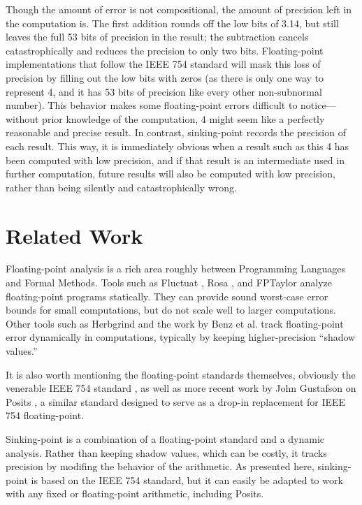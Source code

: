 \documentclass[letterpaper,10pt]{article}
\begin{document}
Though the amount of error is not compositional, the amount of precision left in the computation is. The first addition rounds off the low bits of 3.14, but still leaves the full 53 bits of precision in the result; the subtraction cancels catastrophically and reduces the precision to only two bits. Floating-point implementations that follow the IEEE 754 standard will mask this loss of precision by filling out the low bits with zeros (as there is only one way to represent 4, and it has 53 bits of precision like every other non-subnormal number). This behavior makes some floating-point errors difficult to notice---without prior knowledge of the computation, 4 might seem like a perfectly reasonable and precise result. In contrast, sinking-point records the precision of each result. This way, it is immediately obvious when a result such as this 4 has been computed with low precision, and if that result is an intermediate used in further computation, future results will also be computed with low precision, rather than being silently and catastrophically wrong.

\section{Related Work}

Floating-point analysis is a rich area roughly between Programming Languages and Formal Methods. Tools such as Fluctuat \cite{fluctuat}, Rosa \cite{rosa}, and FPTaylor \cite{fptaylor} analyze floating-point programs statically. They can provide sound worst-case error bounds for small computations, but do not scale well to larger computations. Other tools such as Herbgrind \cite{herbgrind} and the work by Benz et al. \cite{benz2012dynamic} track floating-point error dynamically in computations, typically by keeping higher-precision ``shadow values.''

It is also worth mentioning the floating-point standards themselves, obviously the venerable IEEE 754 standard \cite{ieee754-2008}, as well as more recent work by John Gustafson on Posits \cite{beating754}, a similar standard designed to serve as a drop-in replacement for IEEE 754 floating-point.

Sinking-point is a combination of a floating-point standard and a dynamic analysis. Rather than keeping shadow values, which can be costly, it tracks precision by modifing the behavior of the arithmetic. As presented here, sinking-point is based on the IEEE 754 standard, but it can easily be adapted to work with any fixed or floating-point arithmetic, including Posits.
\end{document}

